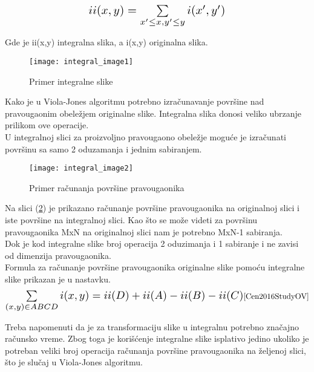 \begin{equation}
  \Scale[1.4]{ii(x,y)=\sum\limits_{x'\leq x, y'\leq y} i(x',y')}
  \label{IntegralImage_eq1}
\end{equation}

Gde je ii(x,y) integralna slika, a i(x,y) originalna slika. \\

\begin{figure}[H]
  \centering
  \texttt{[image: integral\_image1]}
  \caption{Primer integralne slike}
  \label{IntegralImage_img1}
\end{figure}

Kako je u Viola-Jones algoritmu potrebno izračunavanje površine nad pravougaonim
obeležjem originalne slike.
Integralna slika donosi veliko ubrzanje prilikom ove operacije. \\
U integralnoj slici za proizvoljno pravougaono obeležje moguće je izračunati
površinu sa samo 2 oduzamanja i jednim sabiranjem. \\

\begin{figure}[H]
  \centering
  \texttt{[image: integral\_image2]}
  \caption{Primer računanja površine pravougaonika \cite{IntegralImage1_web}}
  \label{IntegralImage_img2}
\end{figure}

Na slici (\ref{IntegralImage_img2}) je prikazano računanje površine pravougaonika na
originalnoj slici i iste površine na integralnoj slici.
Kao što se može videti za površinu pravougaonika MxN na originalnoj slici nam je
potrebno MxN-1 sabiranja. \\
Dok je kod integralne slike broj operacija 2 oduzimanja i 1 sabiranje i ne
zavisi od dimenzija pravougaonika. \\

Formula za računanje površine pravougaonika originalne slike pomoću integralne
slike prikazan je u nastavku. \\

\begin{equation}
  \Scale[1.4]{\sum\limits_{(x,y)\in ABCD} i(x,y)=ii(D)+ii(A)-ii(B)-ii(C)}
  \cite{Cen2016StudyOV}
  \label{IntegralImage_eq2}
\end{equation}

Treba napomenuti da je za transformaciju slike u integralnu potrebno značajno
računsko vreme.
Zbog toga je korišćenje integralne slike isplativo jedino ukoliko je potreban
veliki broj operacija računanja površine pravougaonika na željenoj slici, što je
slučaj u Viola-Jones algoritmu. \\

